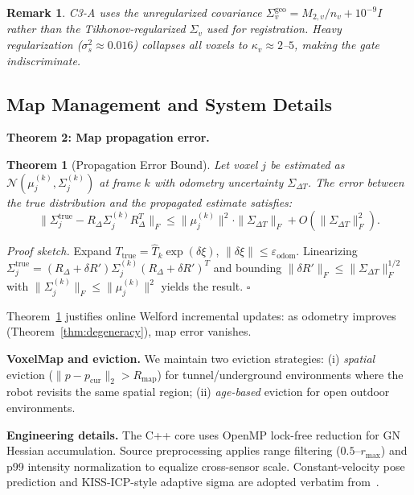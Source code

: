 \documentclass[letterpaper, 10pt, conference]{ieeeconf}
\newtheorem{theorem}{Theorem}
\newtheorem{remark}{Remark}
\begin{document}
\begin{remark}
C3-A uses the unregularized covariance $\Sigma_v^{\mathrm{geo}} = M_{2,v}/n_v + 10^{-9}I$
rather than the Tikhonov-regularized $\Sigma_v$ used for registration.
Heavy regularization ($\sigma_s^2 \approx 0.016$) collapses all voxels to
$\kappa_v \approx 2$--$5$, making the gate indiscriminate.
\end{remark}

\subsection{Map Management and System Details}\label{sec:impl}

\textbf{Theorem 2: Map propagation error.}
\begin{theorem}[Propagation Error Bound]\label{thm:map}
Let voxel $j$ be estimated as $\mathcal{N}(\mu_j^{(k)}, \Sigma_j^{(k)})$ at frame $k$
with odometry uncertainty $\Sigma_{\Delta T}$.
The error between the true distribution and the propagated estimate satisfies:
\begin{equation}
  \bigl\|\Sigma_j^{\mathrm{true}} - R_\Delta\Sigma_j^{(k)}R_\Delta^T\bigr\|_F
  \leq \|\mu_j^{(k)}\|^2 \cdot \|\Sigma_{\Delta T}\|_F + O(\|\Sigma_{\Delta T}\|_F^2).
  \label{eq:thm2}
\end{equation}
\end{theorem}
\textit{Proof sketch.}
Expand $T_{\mathrm{true}} = \hat{T}_k\exp(\delta\xi)$, $\|\delta\xi\| \leq \varepsilon_{\mathrm{odom}}$.
Linearizing $\Sigma_j^{\mathrm{true}} = (R_\Delta + \delta R')\Sigma_j^{(k)}(R_\Delta + \delta R')^T$
and bounding $\|\delta R'\|_F \leq \|\Sigma_{\Delta T}\|_F^{1/2}$ with
$\|\Sigma_j^{(k)}\|_F \leq \|\mu_j^{(k)}\|^2$ yields the result. $\square$

Theorem~\ref{thm:map} justifies online Welford incremental updates:
as odometry improves (Theorem~\ref{thm:degeneracy}), map error vanishes.

\textbf{VoxelMap and eviction.}
We maintain two eviction strategies:
(i) \textit{spatial} eviction ($\|p - p_{\mathrm{cur}}\|_2 > R_{\mathrm{map}}$)
for tunnel/underground environments where the robot revisits the same spatial region;
(ii) \textit{age-based} eviction for open outdoor environments.

\textbf{Engineering details.}
The C++ core uses OpenMP lock-free reduction for GN Hessian accumulation.
Source preprocessing applies range filtering ($0.5$--$r_{\max}$) and
p99 intensity normalization to equalize cross-sensor scale.
Constant-velocity pose prediction and KISS-ICP-style adaptive sigma
are adopted verbatim from~\cite{vizzo2023kiss}.
\end{document}
